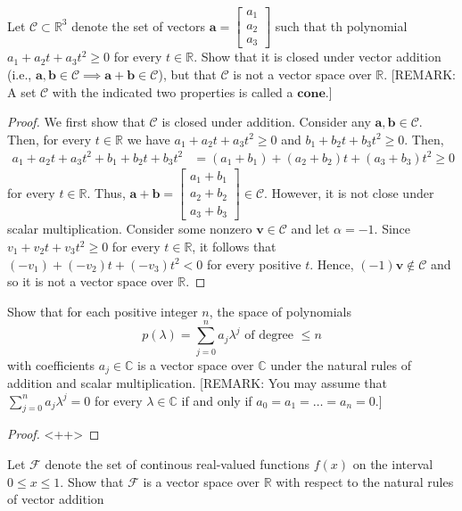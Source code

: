\documentclass[12pt]{article}
\newcommand{\R}{\mathbb{R}}
\newenvironment{problem}[2][Problem]{\begin{trivlist} \item[\hskip \labelsep {\bfseries #1}\hskip \labelsep {\bfseries #2.}]}{\end{trivlist}}
\begin{document}
    \begin{problem}{1.3}
      Let $\mathcal{C}\subset \R^{3}$ denote the set of vectors $\mathbf{a} = \begin{bmatrix} a_{1}\\ a_{2}\\ a_{3}\end{bmatrix}$ such that th polynomial $a_{1} + a_{2}t + a_{3}t^{2} \geq 0$ for every $t\in \R$. Show that it is closed under vector addition (i.e., $\mathbf{a},\mathbf{b} \in \mathcal{C} \implies \mathbf{a}+\mathbf{b} \in \mathcal{C}$), but that $\mathcal{C}$ is not a vector space over $\R$. [REMARK: A set $\mathcal{C}$ with the indicated two properties is called a $\mathbf{cone}$.]
    \begin{proof}
      We first show that $\mathcal{C}$ is closed under addition. Consider any $\mathbf{a}, \mathbf{b}\in \mathcal{C}$. Then, for every $t\in \R$ we have $a_{1} + a_{2}t + a_{3}t^{2} \geq 0$ and $b_{1}+b_{2}t+b_{3}t^{2}\geq 0$. Then, 
    \begin{align*}
      a_{1} + a_{2}t + a_{3}t^{2} + b_{1}+b_{2}t+b_{3}t^{2} &= (a_{1} + b_{1}) + (a_{2} + b_{2})t + (a_{3}+b_{3})t^{2} \geq 0
    \end{align*}
    for every $t\in \R$. Thus, $\mathbf{a} + \mathbf{b} = \begin{bmatrix} a_{1}+b_{1}\\ a_{2} + b_{2}\\ a_{3}+b_{3} \end{bmatrix} \in \mathcal{C}$. However, it is not close under scalar multiplication. Consider some nonzero $\mathbf{v} \in \mathcal{C}$ and let $\alpha = -1$. Since $v_{1} + v_{2}t + v_{3}t^{2} \geq 0$ for every $t\in \R$, it follows that $(-v_{1}) + (-v_{2})t + (-v_{3})t^{2}<0$ for every positive $t$. Hence, $(-1)\mathbf{v} \not\in \mathcal{C}$ and so it is not a vector space over $\R$.
    \end{proof}
    \end{problem}
    \begin{problem}{1.4}
      Show that for each positive integer $n$, the space of polynomials
    \begin{equation*}
      p(\lambda) = \sum_{j=0}^{n} a_{j}\lambda^{j} \text{ of degree } \leq n
    \end{equation*}
    with coefficients $a_{j}\in \mathbb{C}$ is a vector space over $\mathbb{C}$ under the natural rules of addition and scalar multiplication. [REMARK: You may assume that $\sum_{j=0}^{n} a_{j}\lambda^{j} = 0$ for every $\lambda \in \mathbb{C}$ if and only if $a_{0} = a_{1} = \dots = a_{n} = 0$.]
    \begin{proof}<++>
    \end{proof}
    \end{problem}
    \begin{problem}{1.5}
      Let $\mathcal{F}$ denote the set of continous real-valued functions $f(x)$ on the interval $0\leq x \leq 1$. Show that $\mathcal{F}$ is a vector space over $\R$ with respect to the natural rules of vector addition
    \end{problem}
\end{document}
